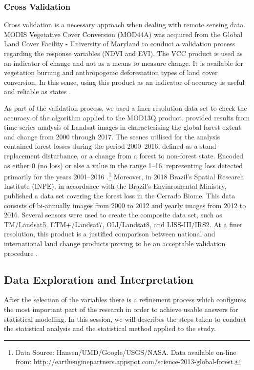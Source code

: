 \subsubsection{Cross Validation} 

Cross validation is a necessary approach when dealing with remote sensing data. MODIS Vegetative Cover Conversion (MOD44A) was acquired from the Global Land Cover Facility - University of Maryland \citep{glcf_2018} to conduct a validation process regarding the response variables (NDVI and EVI). The VCC product is used as an indicator of change and not as a means to measure change. It is available for vegetation burning and anthropogenic deforestation types of land cover conversion. In this sense, using this product as an indicator of accuracy is useful and reliable as states \citet{defries_2002}.

As part of the validation process, we used a finer resolution data set to check the accuracy of the algorithm applied to the MOD13Q product. \citet{Hansen_2013} provided results from time-series analysis of Landsat images in characterising the global forest extent and change from 2000 through 2017. The scenes utilised for the analysis contained forest losses during the period 2000–2016, defined as a stand-replacement disturbance, or a change from a forest to non-forest state. Encoded as either 0 (no loss) or else a value in the range 1–16, representing loss detected primarily for the years 2001–2016 \citep{gfc_2017}.\footnote{Data Source: Hansen/UMD/Google/USGS/NASA. Data available on-line from: http://earthenginepartners.appspot.com/science-2013-global-forest.} Moreover, in 2018 Brazil's Spatial Research Institute (INPE), in accordance with the Brazil's Envinromental Ministry, published a data set covering the forest loss in the Cerrado Biome. This data consists of bi-annually images from 2000 to 2012 and yearly images from 2012 to 2016. Several sensors were used to create the composite data set, such as TM/Landsat5, ETM+/Landsat7, OLI/Landsat8, and LISS-III/IRS2. At a finer resolution, this product is a justified comparison between national and international land change products proving to be an acceptable validation procedure \citep{brito_2018}.


\subsection{Data Exploration and Interpretation}

After the selection of the variables there is a refinement process which configures the most important part of the research in order to achieve usable answers for statistical modelling. In this session, we will describes the steps taken to conduct the statistical analysis and the statistical method applied to the study.

